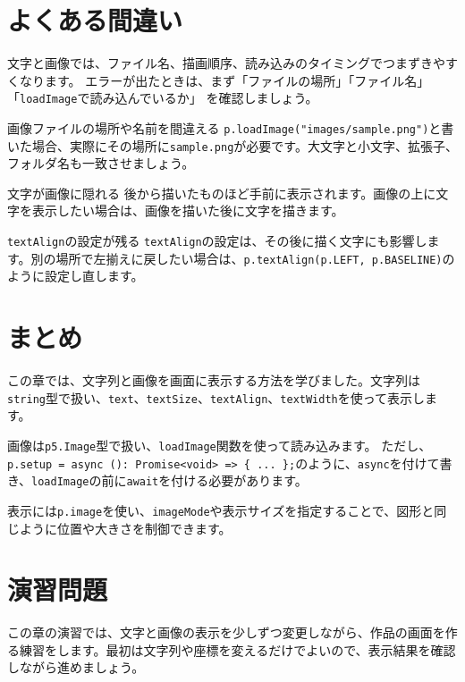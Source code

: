 \section{よくある間違い}

文字と画像では、ファイル名、描画順序、読み込みのタイミングでつまずきやすくなります。
エラーが出たときは、まず「ファイルの場所」「ファイル名」「\texttt{loadImage}で読み込んでいるか」
を確認しましょう。

\begin{mistakebox}{画像ファイルの場所や名前を間違える}
\texttt{p.loadImage("images/sample.png")}と書いた場合、実際にその場所に\texttt{sample.png}が必要です。大文字と小文字、拡張子、フォルダ名も一致させましょう。
\end{mistakebox}

\begin{mistakebox}{文字が画像に隠れる}
後から描いたものほど手前に表示されます。画像の上に文字を表示したい場合は、画像を描いた後に文字を描きます。
\end{mistakebox}

\begin{mistakebox}{\texttt{textAlign}の設定が残る}
\texttt{textAlign}の設定は、その後に描く文字にも影響します。別の場所で左揃えに戻したい場合は、\texttt{p.textAlign(p.LEFT, p.BASELINE)}のように設定し直します。
\end{mistakebox}

\section{まとめ}

この章では、文字列と画像を画面に表示する方法を学びました。文字列は\texttt{string}型で扱い、\texttt{text}、\texttt{textSize}、\texttt{textAlign}、\texttt{textWidth}を使って表示します。

画像は\texttt{p5.Image}型で扱い、\texttt{loadImage}関数を使って読み込みます。
ただし、\texttt{p.setup = async (): Promise<void> => \{ ... \};}のように、\texttt{async}を付けて書き、\texttt{loadImage}の前に\texttt{await}を付ける必要があります。

表示には\texttt{p.image}を使い、\texttt{imageMode}や表示サイズを指定することで、図形と同じように位置や大きさを制御できます。

\section{演習問題}

この章の演習では、文字と画像の表示を少しずつ変更しながら、作品の画面を作る練習をします。最初は文字列や座標を変えるだけでよいので、表示結果を確認しながら進めましょう。

